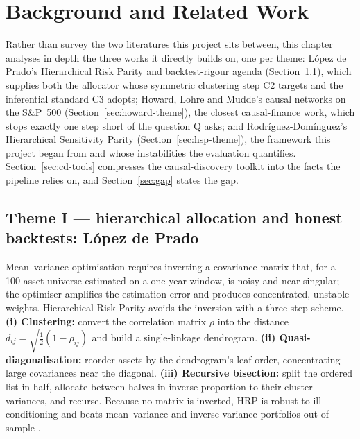 \chapter{Background and Related Work}
\label{chap:background}

Rather than survey the two literatures this project sits between, this chapter
analyses in depth the three works it directly builds on, one per theme:
L\'opez de Prado's Hierarchical Risk Parity and backtest-rigour agenda
(Section~\ref{sec:hrp-theme}), which supplies both the allocator whose
symmetric clustering step C2 targets and the inferential standard C3 adopts;
Howard, Lohre and Mudde's causal networks on the S\&P~500
(Section~\ref{sec:howard-theme}), the closest causal-finance work, which stops
exactly one step short of the question Q asks; and Rodr\'iguez-Dom\'inguez's
Hierarchical Sensitivity Parity (Section~\ref{sec:hsp-theme}), the framework
this project began from and whose instabilities the evaluation quantifies.
Section~\ref{sec:cd-tools} compresses the causal-discovery toolkit into the
facts the pipeline relies on, and Section~\ref{sec:gap} states the gap.

\section{Theme I --- hierarchical allocation and honest backtests:
L\'opez de Prado}
\label{sec:hrp-theme}

Mean--variance optimisation \cite{markowitz1952portfolio} requires inverting a
covariance matrix that, for a 100-asset universe estimated on a one-year
window, is noisy and near-singular; the optimiser amplifies the estimation
error and produces concentrated, unstable weights. Hierarchical Risk Parity
\cite{lopezdeprado2016hrp} avoids the inversion with a three-step scheme.
\textbf{(i) Clustering:} convert the correlation matrix $\rho$ into the
distance $d_{ij} = \sqrt{\tfrac{1}{2}(1-\rho_{ij})}$ and build a
single-linkage dendrogram. \textbf{(ii) Quasi-diagonalisation:} reorder assets
by the dendrogram's leaf order, concentrating large covariances near the
diagonal. \textbf{(iii) Recursive bisection:} split the ordered list in half,
allocate between halves in inverse proportion to their cluster variances, and
recurse. Because no matrix is inverted, HRP is robust to ill-conditioning and
beats mean--variance and inverse-variance portfolios out of sample
\cite{lopezdeprado2016hrp}.

